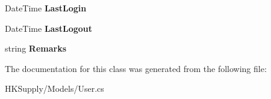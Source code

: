 \begin{DoxyCompactItemize}
\item 
\mbox{\label{class_h_k_supply_1_1_models_1_1_user_ad73610de042dfdb05a48503dab3c43b4}} 
Date\+Time {\bfseries Last\+Login}
\item 
\mbox{\label{class_h_k_supply_1_1_models_1_1_user_a8b7622cd2a564e0c11ae2ea3eb7fdadc}} 
Date\+Time {\bfseries Last\+Logout}
\item 
\mbox{\label{class_h_k_supply_1_1_models_1_1_user_a147c1d1d721f15b477caaf2b6ce75321}} 
string {\bfseries Remarks}
\end{DoxyCompactItemize}


The documentation for this class was generated from the following file\+:\begin{DoxyCompactItemize}
\item 
H\+K\+Supply/\+Models/User.\+cs\end{DoxyCompactItemize}
